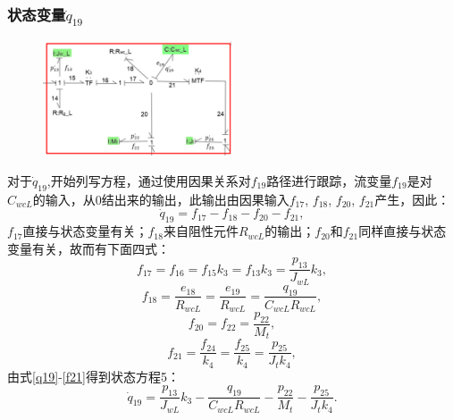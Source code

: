 \subsubsection{状态变量$\dot{ q}_{19}$}
\begin{figure}[h]
	\centering
	\includegraphics[width=0.5\textwidth]{fig/equation5.png}
	\caption{}\label{fig:equation5}
\end{figure}
对于$\dot{q} _ { 19 }$,开始列写方程，通过使用因果关系对$f_{19}$路径进行跟踪，流变量$f_{19}$是对$C_{wcL}$的输入，从0结出来的输出，此输出由因果输入$f _ { 17 }$, $f _ { 18 }$, $ f _ { 20 }$, $  f _ { 21 }$产生，因此：
\begin{equation}\label{q19}
\dot { q } _ { 19 } = f _ { 17 } - f _ { 18 } - f _ { 20 } - f _ { 21 },
\end{equation}
$f_{17}$直接与状态变量有关；$f_{18}$来自阻性元件$R _ { wcL }$的输出；$f_{20}$和$f_{21}$同样直接与状态变量有关，故而有下面四式：
\begin{equation}
f _ { 17 } = f _ { 16 } = f _ { 15 } k _ { 3 } = f _ { 13 } k _ { 3 } = \frac { p _ { 13 } } { J _ { w L} } k _ { 3 },
\end{equation}
\begin{equation}
f _ { 18 } = \frac { e _ { 18 } } { R _ { w c L}  } = \frac { e _ { 19 } } { R _ { w cL  } } = \frac { q _ { 19 } } { C _ { w c  L} R _ { w c L } },
\end{equation}
\begin{equation}
f _ { 20 } = f _ { 22 } = \frac { p _ { 22 } } { M _ { t } },
\end{equation}
\begin{equation}\label{f21}
f _ { 21 } = \frac { f _ { 24 } } { k _ { 4 } } = \frac { f _ { 25 } } { k _ { 4 } } = \frac { p _ { 25 } } { J _ { t } k _ { 4 } },
\end{equation}
由式\ref{q19}-\ref{f21}得到状态方程5：
\begin{equation}
\dot { q } _ { 19 } = \frac { p _ { 13 } } { J _ { w L }  } k _ { 3 } - \frac { q _ { 19 } } { C _ { w c L }  R _ { w c L }  } - \frac { p _ { 22 } } { M _ { t } } - \frac { p _ { 25 } } { J _ { t } k _ { 4 } }.
\end{equation}
